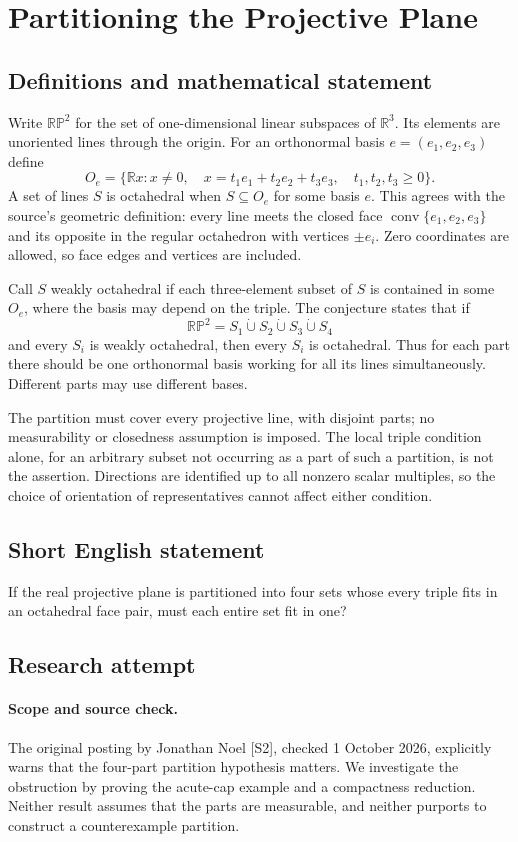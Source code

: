 \documentclass[11pt,a4paper]{article}
\begin{document}
\section*{Partitioning the Projective Plane}\label{statement}

\subsection{Definitions and mathematical statement}
Write $\mathbb{RP}^2$ for the set of one-dimensional linear subspaces of
$\mathbb R^3$. Its elements are unoriented lines through the origin.
For an orthonormal basis $e=(e_1,e_2,e_3)$ define
\[
 O_e=\{\mathbb R x:x\ne0,\quad
                x=t_1e_1+t_2e_2+t_3e_3,\quad t_1,t_2,t_3\ge0\}.
\]
A set of lines $S$ is octahedral when $S\subseteq O_e$ for some basis $e$.
This agrees with the source's geometric definition: every line meets
the closed face $\operatorname{conv}\{e_1,e_2,e_3\}$ and its opposite in
the regular octahedron with vertices $\pm e_i$. Zero coordinates are allowed,
so face edges and vertices are included.

Call $S$ weakly octahedral if each three-element subset of $S$ is
contained in some $O_e$, where the basis may depend on the triple.
The conjecture states that if
\[
 \mathbb{RP}^2=S_1\mathbin{\dot\cup}S_2\mathbin{\dot\cup}S_3
                         \mathbin{\dot\cup}S_4
\]
and every $S_i$ is weakly octahedral, then every $S_i$ is octahedral.
Thus for each part there should be one orthonormal basis working for
all its lines simultaneously. Different parts may use different bases.

The partition must cover every projective line, with disjoint parts;
no measurability or closedness assumption is imposed. The local triple
condition alone, for an arbitrary subset not occurring as a part of such
a partition, is not the assertion. Directions are identified up to all
nonzero scalar multiples, so the choice of orientation of representatives
cannot affect either condition.
\subsection{Short English statement}
If the real projective plane is partitioned into four sets whose every triple fits in an octahedral face pair, must each entire set fit in one?
\subsection{Research attempt}
\paragraph{Scope and source check.}
The original posting by Jonathan Noel [S2], checked 1 October 2026, explicitly
warns that the four-part partition hypothesis matters. We investigate the
obstruction by proving the acute-cap example and a compactness reduction.
Neither result assumes that the parts are measurable, and neither purports
to construct a counterexample partition.
\end{document}

